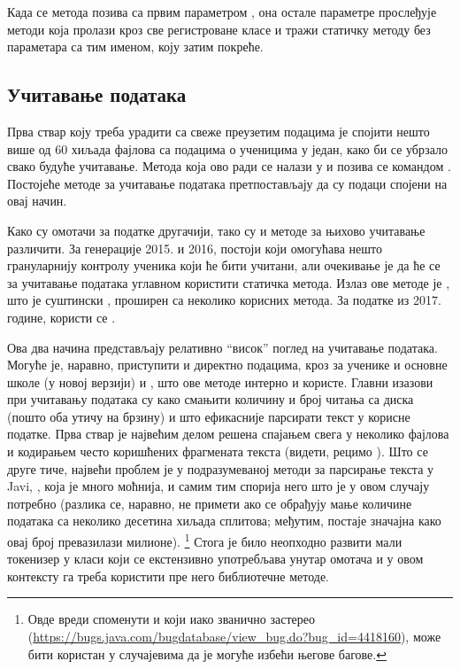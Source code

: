 Када се  метода позива са првим параметром , она остале параметре прослеђује  методи која пролази кроз све регистроване класе и тражи статичку методу без параметара са тим именом, коју затим покреће.

\subsection{Учитавање података}

Прва ствар коју треба урадити са свеже преузетим подацима је спојити нешто више од 60 хиљада фајлова са подацима о ученицима у један, како би се убрзало свако будуће учитавање. Метода која ово ради се налази у  и позива се командом . Постојеће методе за учитавање података претпостављају да су подаци спојени на овај начин.

Како су омотачи за податке другачији, тако су и методе за њихово учитавање различити. За генерације 2015. и 2016, постоји  који омогућава нешто грануларнију контролу ученика који ће бити учитани, али очекивање је да ће се за учитавање података углавном користити  статичка метода. Излаз ове методе је , што је суштински , проширен са неколико корисних метода. За податке из 2017. године, користи се .

Ова два начина представљају релативно \enquote{висок} поглед на учитавање података. Могуће је, наравно, приступити и директно подацима, кроз  за ученике и основне школе (у новој верзији) и , што ове методе интерно и користе. Главни изазови при учитавању података су како смањити количину и број читања са диска (пошто оба утичу на брзину) и што ефикасније парсирати текст у корисне податке. Прва ствар је највећим делом решена спајањем свега у неколико фајлова и кодирањем често коришћених фрагмената текста (видети, рецимо ). Што се друге тиче, највећи проблем је у подразумеваној методи за парсирање текста у Javi, , која је много моћнија, и самим тим спорија него што је у овом случају потребно (разлика се, наравно, не примети ако се обрађују мање количине података са неколико десетина хиљада сплитова; међутим, постаје значајна како овај број превазилази милионе). \footnote{Овде вреди споменути и  који иако званично застерео (\url{https://bugs.java.com/bugdatabase/view_bug.do?bug_id=4418160}), може бити користан у случајевима да је могуће избећи његове багове.} Стога је било неопходно развити мали токенизер у класи  који се екстензивно употребљава унутар омотача и у овом контексту га треба користити пре него библиотечне методе.

